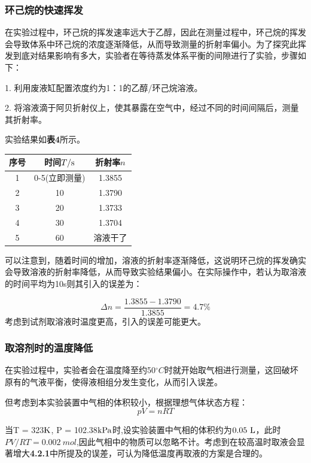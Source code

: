 \documentclass[12pt]{article}
\begin{document}
					\subsubsection{环己烷的快速挥发}
					在实验过程中，环己烷的挥发速率远大于乙醇，因此在测量过程中，环己烷的挥发会导致体系中环己烷的浓度逐渐降低，从而导致测量的折射率偏小。为了探究此挥发到底对结果影响有多大，实验者在等待蒸发体系平衡的间隙进行了实验，步骤如下：\par
					1. 利用废液缸配置浓度约为1：1的乙醇/环己烷溶液。\par
					2. 将溶液滴于阿贝折射仪上，使其暴露在空气中，经过不同的时间间隔后，测量其折射率。\par
					实验结果如\textbf{表4}所示。\par
					\begin{table}[h]
						\centering
						\begin{tabular}{ccc}
							\toprule
							序号& 时间$T/{\rm s}$ & 折射率$n$ \\
							\midrule
							1&0-5(立即测量)& 1.3855 \\
							2&10 & 1.3790  \\
							3&20 & 1.3733  \\
							4&30 & 1.3704  \\
							5&60 & 溶液干了  \\
							\bottomrule
						\end{tabular}
					\end{table}
					\par
					可以注意到，随着时间的增加，溶液的折射率逐渐降低，这说明环己烷的挥发确实会导致溶液的折射率降低，从而导致实验结果偏小。在实际操作中，若认为取溶液的时间平均为10s则其引入的误差为：\par
					$$
					\Delta n=\frac{1.3855-1.3790}{1.3855}=4.7\%
					$$
					考虑到试剂取溶液时温度更高，引入的误差可能更大。\par
					\subsubsection{取溶剂时的温度降低}
					在实验过程中，实验者会在温度降至约50$^{\circ}C$时就开始取气相进行测量，这回破坏原有的气液平衡，使得液相组分发生变化，从而引入误差。\par
					但考虑到本实验装置中气相的体积较小，根据理想气体状态方程：
					$$
					pV=nRT
					$$
					\par
					当T = 323${\rm K}$, P = 102.38${\rm kPa}$时,设实验装置中气相的体积约为$0.05\ {\rm L}$，此时$PV/RT=0.002 \ mol$,因此气相中的物质可以忽略不计。考虑到在较高温时取液会显著增大\textbf{4.2.1}中所提及的误差，可认为降低温度再取液的方案是合理的。\par
\end{document}
